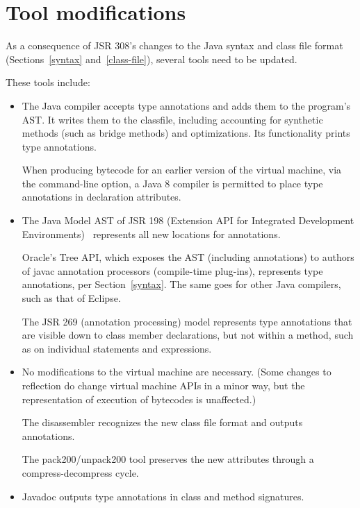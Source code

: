 \documentclass[10pt]{article}
\begin{document}
\section{Tool modifications\label{mods-discussion}}

As a consequence of JSR 308's changes to the Java syntax and class file
format (Sections~\ref{syntax} and~\ref{class-file}), several tools need to
be updated.

These tools include:
\begin{itemize}
\item
  The Java compiler accepts type annotations and adds them to the program's
  AST\@.  It writes them to the classfile, including accounting for
  synthetic methods (such as bridge methods) and optimizations.  Its
   functionality prints type annotations.

  When producing bytecode for an earlier version of the
  virtual machine, via the  command-line option, a Java 8
  compiler is permitted to place type
  annotations in declaration attributes.

\item
  The Java Model AST of JSR 198 (Extension API for Integrated Development
  Environments)~\cite{JSR198} represents all new locations for annotations.

  Oracle's Tree API, which exposes the AST (including annotations) to
  authors of javac annotation processors (compile-time plug-ins),
  represents type annotations, per Section~\ref{syntax}.  The same goes for
  other Java compilers, such as that of Eclipse.

  The JSR 269 (annotation processing) model
  represents type annotations that are visible down to class member
  declarations,
  but not within a
  method, such as on individual statements and expressions.

\item
  No modifications to the virtual machine are necessary.
  (Some changes to reflection do change virtual machine APIs in a minor
  way, but the representation of execution of bytecodes is unaffected.)
  
  The  disassembler recognizes the new class
  file format and outputs annotations.
  
  The pack200/unpack200 tool preserves the new attributes through a
  compress-decompress cycle.

\item
  Javadoc  outputs type annotations in class and method signatures.

\end{itemize}
\end{document}
